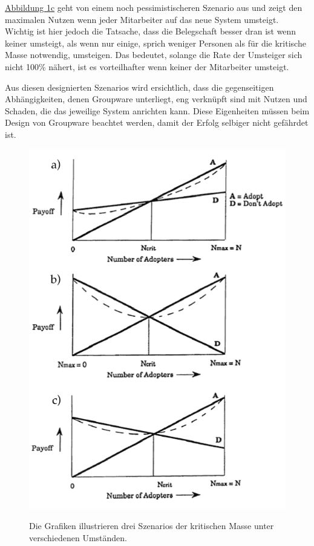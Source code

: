 \medskip \hyperref[fig:markusMass]{Abbildung \ref*{fig:markusMass}c} geht von einem noch pessimistischeren Szenario aus und zeigt den maximalen Nutzen wenn jeder Mitarbeiter auf das neue System umsteigt. Wichtig ist hier jedoch die Tatsache, dass die Belegschaft besser dran ist wenn keiner umsteigt, als wenn nur einige, sprich weniger Personen als für die kritische Masse notwendig, umsteigen. Das bedeutet, solange die Rate der Umsteiger sich nicht 100\% nähert, ist es vorteilhafter wenn keiner der Mitarbeiter umsteigt.

\medskip Aus diesen designierten Szenarios wird ersichtlich, dass die gegenseitigen Abhängigkeiten, denen Groupware unterliegt, eng verknüpft sind mit Nutzen und Schaden, die das jeweilige System anrichten kann. Diese Eigenheiten müssen beim Design von Groupware beachtet werden, damit der Erfolg selbiger nicht gefährdet ist. \citep{Markus:1990}

\begin{figure}
	{\includegraphics[width=1\linewidth]{gfx/markusCriticalMass}}
\caption[Die kritische Masse \newline \citep{Markus:1990}]{Die Grafiken illustrieren drei Szenarios der kritischen Masse unter verschiedenen Umständen.}\label{fig:markusMass}
\end{figure}

